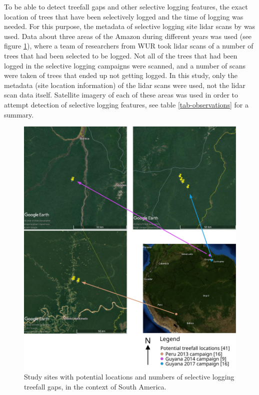 \documentclass[a4paper,12pt]{scrbook}
\begin{document}
To be able to detect treefall gaps and other selective logging features, the exact location of trees that have been selectively logged and the time of logging was needed. For this purpose, the metadata of selective logging site lidar scans by \citet{gonzalez_de_tanago_menaca_estimation_2017} was used. Data about three areas of the Amazon during different years was used (see figure \ref{fig-all-sites}), where a team of researchers from \ac{WUR} took lidar scans of a number of trees that had been selected to be logged. Not all of the trees that had been logged in the selective logging campaigns were scanned, and a number of scans were taken of trees that ended up not getting logged. In this study, only the metadata (site location information) of the lidar scans were used, not the lidar scan data itself. Satellite imagery of each of these areas was used in order to attempt detection of selective logging features, see table \ref{tab-observations} for a summary.

\begin{figure}
    \centering
    \includegraphics[width=\textwidth]{thesis-figures/17-all-sites-odg}
    \caption{Study sites with potential locations and numbers of selective logging treefall gaps, in the context of South America.}
    \label{fig-all-sites}
\end{figure}
\end{document}

